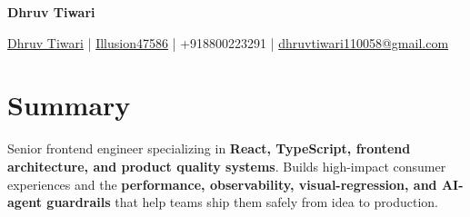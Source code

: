 \documentclass[a4paper,11pt]{article}
\newcommand{\socialicon}[1]{\raisebox{-0.05em}{\resizebox{!}{1em}{#1}}}
\newcommand{\headerfontiii}{\fontfamily{ppl}\selectfont} %
\begin{document}
\headerfontiii

\begin{center}
    {\Huge\textbf{Dhruv Tiwari}}
\end{center}
\vspace{-6mm}

\begin{center}
    \small{
    \socialicon{\faLinkedin} \href{https://www.linkedin.com/in/dhruvtiwari47586/}{Dhruv Tiwari} |
    \socialicon{\faGithub} \href{https://github.com/Illusion47586}{Illusion47586} |
    +918800223291 | \href{mailto:dhruvtiwari110058@gmail.com}{dhruvtiwari110058@gmail.com}
    }
\end{center}

\vspace{-6mm}

\section{\textbf{Summary}}
\vspace{1mm}
\small{
Senior frontend engineer specializing in \textbf{React, TypeScript, frontend architecture, and product quality systems}. Builds high-impact consumer experiences and the \textbf{performance, observability, visual-regression, and AI-agent guardrails} that help teams ship them safely from idea to production.
}
\vspace{-2mm}
\end{document}
